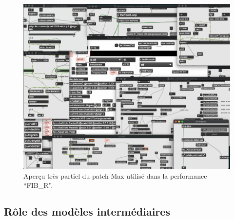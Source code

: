 \begin{figure}[!htbp]
	\captionsetup{format=plain}
	\includegraphics[width=\textwidth]{gfx/04_algorithms/FIBR-patch.png}
	\caption[Aperçu très partiel d'un patch Max]{Aperçu très partiel du patch Max utilisé dans la performance ``FIB\_R''.}
	\label{fig:algorithms:FIBR-patch}
\end{figure}

\subsection{Rôle des modèles intermédiaires}

